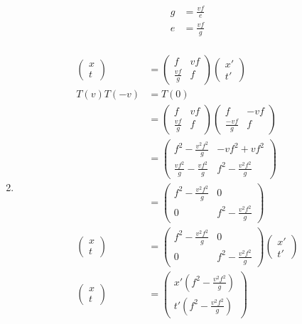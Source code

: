 \documentclass[11pt,letterpaper, twocolumn]{article}
\begin{document}
\begin{enumerate}[label=(\alph*)]
\begin{align*}
        g &= \frac{vf}{e}\\
        e &= \frac{vf}{g}\\
    \end{align*}
    \item \begin{align*}
        \begin{pmatrix}x\\t\end{pmatrix} &= \begin{pmatrix}f&vf\\\frac{vf}{g}&f\end{pmatrix}\begin{pmatrix}x'\\t'\end{pmatrix}\\
        T(v)T(-v) &= T(0)\\
        &=\begin{pmatrix}f&vf\\\frac{vf}{g}&f\end{pmatrix}\begin{pmatrix}f&-vf\\\frac{-vf}{g}&f\end{pmatrix}\\
        &= \begin{pmatrix}f^2-\frac{v^2f^2}{g} & -vf^2+vf^2\\\frac{vf^2}{g}-\frac{vf^2}{g} & f^2-\frac{v^2f^2}{g}\end{pmatrix}\\
        &= \begin{pmatrix}f^2-\frac{v^2f^2}{g} & 0\\0 & f^2-\frac{v^2f^2}{g}\end{pmatrix}\\
        \begin{pmatrix}x\\t\end{pmatrix} &= \begin{pmatrix}f^2-\frac{v^2f^2}{g} & 0\\0 & f^2-\frac{v^2f^2}{g}\end{pmatrix}\begin{pmatrix}x'\\t'\end{pmatrix}\\
        \begin{pmatrix}x\\t\end{pmatrix} &= \begin{pmatrix}x'(f^2-\frac{v^2f^2}{g})\\t'(f^2-\frac{v^2f^2}{g})\end{pmatrix}\\

\end{align*}
\end{enumerate}
\end{document}

